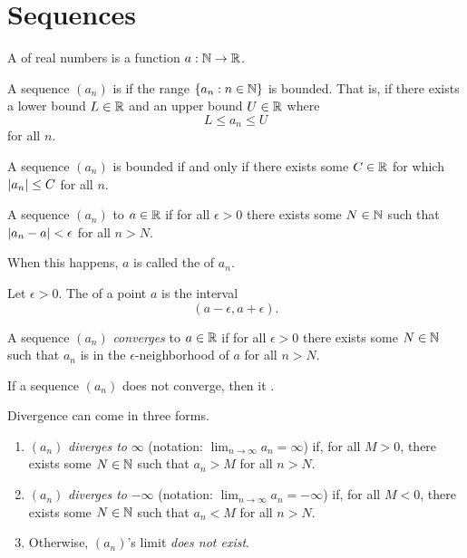 \documentclass[11pt,twoside=off,numbers=noenddot]{scrbook}
\begin{document}
\chapter{Sequences}
\begin{definition}
    A  of real numbers is a function $a : \mathbb N \to \mathbb R$.
\end{definition}

\begin{definition}
    A sequence $(a_n)$ is  if the range $\{ a_n : n \in \mathbb N \}$ is bounded. That is, if there exists a lower bound $L \in \mathbb R$ and an upper bound $U \in \mathbb R$ where
    \[ L \leq a_n \leq U \]
    for all $n$.
\end{definition}

\begin{proposition}
    A sequence $(a_n)$ is bounded if and only if there exists some $C \in \mathbb R$ for which $| a_n | \leq C$ for all $n$.
\end{proposition}

\begin{definition}
    A sequence $(a_n)$  to $a \in \mathbb R$ if for all $\epsilon > 0$ there exists some $N \in \mathbb N$ such that $| a_n - a | < \epsilon$ for all $n > N$.

    When this happens, $a$ is called the  of $a_n$.
\end{definition}

\begin{definition}
    Let $\epsilon > 0$. The  of a point $a$ is the interval
    \[ (a - \epsilon, a + \epsilon). \]
\end{definition}

\begin{definition}
    A sequence $(a_n)$ \textit{converges} to $a \in \mathbb R$ if for all $\epsilon > 0$ there exists some $N \in \mathbb N$ such that $a_n$ is in the $\epsilon$-neighborhood of $a$ for all $n > N$.
\end{definition}

\begin{definition}
    If a sequence $(a_n)$ does not converge, then it .

    Divergence can come in three forms.
    \begin{enumerate}
        \item $(a_n)$ \textit{diverges to} $\infty$ (notation: $\lim_{n \to \infty} a_n = \infty$) if, for all $M > 0$, there exists some $N \in \mathbb N$ such that $a_n > M$ for all $n > N$.
        \item $(a_n)$ \textit{diverges to} $-\infty$ (notation: $\lim_{n \to \infty} a_n = -\infty$) if, for all $M < 0$, there exists some $N \in \mathbb N$ such that $a_n < M$ for all $n > N$.
        \item Otherwise, $(a_n)$'s limit \textit{does not exist}.
    \end{enumerate}
\end{definition}
\end{document}
